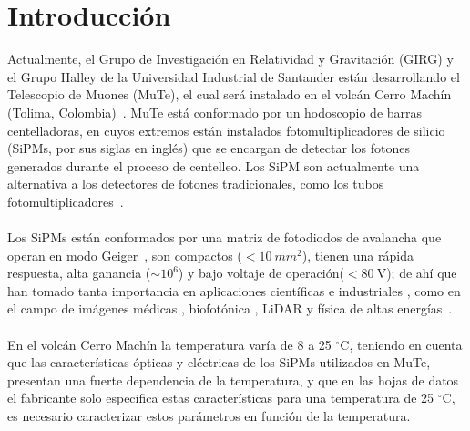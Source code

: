 
\chapter*{Introducción}
\label{Cap:Introduccion}
Actualmente, el Grupo de Investigación en Relatividad y Gravitación (GIRG) y el Grupo Halley de la Universidad Industrial de Santander están desarrollando el Telescopio de Muones (MuTe), el cual será instalado en el volcán  Cerro Machín (Tolima, Colombia)~\citep{Mute_oficial}. MuTe está conformado por un hodoscopio de barras centelladoras, en cuyos extremos están instalados fotomultiplicadores de silicio (SiPMs, por sus siglas en inglés) que se encargan de detectar los fotones generados durante el proceso de centelleo. Los  SiPM son actualmente una alternativa a los detectores de fotones tradicionales, como los tubos fotomultiplicadores~\citep{Intro_SIPM_Sensl}. \\ \\
Los SiPMs están conformados por una matriz de fotodiodos de avalancha que operan en modo Geiger~\citep{Sipm_S13360_1350CS_datasheet}, son compactos ($< 10~mm^2$), tienen una rápida respuesta, alta ganancia ($\sim 10^6$) y bajo voltaje de operación($ < 80~\mbox{V}$); de ahí que han tomado tanta importancia en aplicaciones científicas e industriales \citep{Blue_SIPM}, como en el campo de imágenes médicas \citep{SiPM_PET,SiPM_3D_img}, biofotónica \citep{SiPM_bio,SiPM_bio2}, LiDAR \citep{SiPM_Lidar,SiPM_3D_img} y física de altas energías~\citep{minimute,Mute_oficial}.\\  \\%
 En el volcán Cerro Machín la temperatura varía de 8 a 25 $^{\circ}$C, teniendo en cuenta que las características ópticas y eléctricas de los SiPMs utilizados en MuTe, presentan una fuerte dependencia de la temperatura, y que en las hojas de datos el fabricante solo especifica estas características para una temperatura de 25 $^{\circ}$C, es necesario caracterizar estos parámetros en función de la temperatura. \\ \\  
